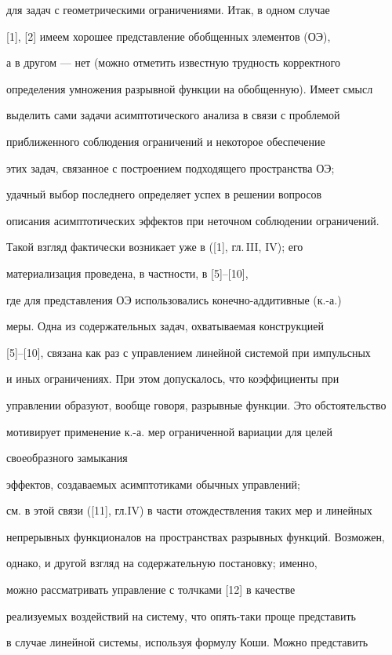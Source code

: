 для задач с геометрическими ограничениями. Итак, в одном случае


[1], [2] имеем хорошее представление обобщенных элементов (ОЭ),


а в другом --- нет (можно отметить известную трудность корректного


определения умножения разрывной функции на обобщенную). Имеет смысл


выделить сами задачи асимптотического анализа в связи с проблемой


приближенного соблюдения ограничений и некоторое обеспечение


этих задач, связанное с построением подходящего пространства ОЭ;


удачный выбор последнего определяет успех в решении вопросов


описания асимптотических эффектов при неточном соблюдении ограничений.


Такой взгляд фактически возникает уже в ([1], гл.\,III, IV); его


материализация проведена, в частности, в [5]--[10],


где для представления ОЭ использовались конечно-аддитивные (к.-а.)


меры. Одна из содержательных задач, охватываемая конструкцией


[5]--[10], связана как раз с управлением линейной системой при импульсных


и иных ограничениях. При этом допускалось, что коэффициенты при


управлении образуют, вообще говоря, разрывные функции. Это обстоятельство


мотивирует применение к.-а. мер ограниченной вариации для целей


своеобразного замыкания


эффектов, создаваемых асимптотиками обычных управлений;


см. в этой связи ([11], гл.IV) в части отождествления таких мер и линейных


непрерывных функционалов на пространствах разрывных функций. Возможен,


однако, и другой взгляд на содержательную постановку; именно,


можно рассматривать управление с толчками [12] в качестве


реализуемых воздействий на систему, что опять-таки проще представить


в случае линейной системы, используя формулу Коши. Можно представить


